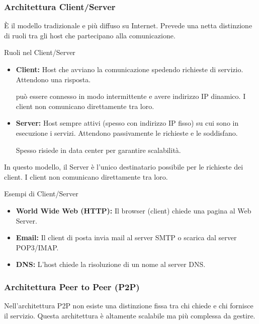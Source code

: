 \documentclass[a4paper,12pt]{report}
\begin{document}

\subsubsection{Architettura Client/Server}

È il modello tradizionale e più diffuso su Internet. Prevede una netta distinzione di ruoli tra gli host che partecipano alla comunicazione.

\begin{defbox}{Ruoli nel Client/Server}
\begin{itemize}
    \item \textbf{Client:} Host che avviano la comunicazione spedendo richieste di servizio. Attendono una risposta.

     può essere connesso in modo intermittente e avere indirizzo IP dinamico. I client non comunicano direttamente tra loro.
    \item \textbf{Server:} Host sempre attivi (spesso con indirizzo IP fisso) su cui sono in esecuzione i servizi. Attendono passivamente le richieste e le soddisfano.

    Spesso risiede in data center per garantire scalabilità.
\end{itemize}
\end{defbox}

In questo modello, il Server è l'unico destinatario possibile per le richieste dei client. I client non comunicano direttamente tra loro.

\begin{esempiobox}{Esempi di Client/Server}
\begin{itemize}
    \item \textbf{World Wide Web (HTTP):} Il browser (client) chiede una pagina al Web Server.
    \item \textbf{Email:} Il client di posta invia mail al server SMTP o scarica dal server POP3/IMAP.
    \item \textbf{DNS:} L'host chiede la risoluzione di un nome al server DNS.
\end{itemize}
\end{esempiobox}

\newpage
\subsubsection{Architettura Peer to Peer (P2P)}

Nell'architettura P2P non esiste una distinzione fissa tra chi chiede e chi fornisce il servizio. Questa architettura è altamente scalabile ma più complessa da gestire.
\end{document}
